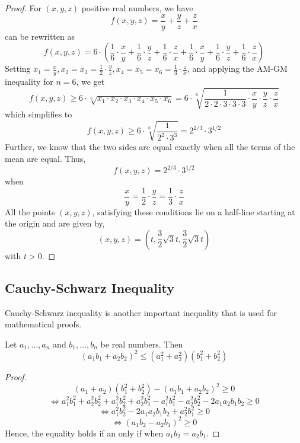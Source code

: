     \begin{proof}
    For \( (x, y, z) \) positive real numbers, we have
    \[
    f(x, y, z) = \frac{x}{y} + \frac{y}{z} + \frac{z}{x}
    \]
    can be rewritten as
    \[
    f(x, y, z) = 6 \cdot \left( \frac{1}{6} \cdot \frac{x}{y} + \frac{1}{6} \cdot \frac{y}{z} + \frac{1}{6} \cdot \frac{z}{x} + \frac{1}{6} \cdot \frac{x}{y} + \frac{1}{6} \cdot \frac{y}{z} + \frac{1}{6} \cdot \frac{z}{x} \right)
    \]
    Setting \( x_1 = \frac{x}{y}, x_2 = x_3 = \frac{1}{2} \cdot \frac{y}{z}, x_4 = x_5 = x_6 = \frac{1}{3} \cdot \frac{z}{x} \), and applying the AM-GM inequality for \( n = 6 \), we get
    \[
    f(x, y, z) \geq 6 \cdot \sqrt[6]{x_1 \cdot x_2 \cdot x_3 \cdot x_4 \cdot x_5 \cdot x_6} = 6 \cdot \sqrt[6]{\frac{1}{2 \cdot 2 \cdot 3 \cdot 3 \cdot 3} \cdot \frac{x}{y} \cdot \frac{y}{z} \cdot \frac{z}{x}}
    \]
    which simplifies to
    \[
    f(x, y, z) \geq 6 \cdot \sqrt[6]{\frac{1}{2^2 \cdot 3^3}} = 2^{2/3} \cdot 3^{1/2}
    \]
    Further, we know that the two sides are equal exactly when all the terms of the mean are equal. Thus,
    \[
    f(x, y, z) = 2^{2/3} \cdot 3^{1/2}
    \]
    when
    \[
    \frac{x}{y} = \frac{1}{2} \cdot \frac{y}{z} = \frac{1}{3} \cdot \frac{z}{x}
    \]
    All the points \( (x, y, z) \), satisfying these conditions lie on a half-line starting at the origin and are given by,
    \[
    (x, y, z) = \left( t, \frac{3}{2}\sqrt{3}t, \frac{3}{2}\sqrt{3}t \right)
    \]
    with \( t > 0 \).
    \end{proof}
    
\subsection{Cauchy-Schwarz Inequality}
Cauchy-Schwarz inequality is another important inequality that is used for mathematical proofs. 

\begin{theorem}\label{CSineq}
    Let \( a_1, \ldots, a_n \) and \( b_1, \ldots, b_n \) be real numbers. Then
\[
(a_1b_1 + a_2b_2)^2 \leq (a_1^2 + a_2^2)(b_1^2 + b_2^2)
\]
\end{theorem}
\begin{proof}
\[
(a_1 + a_2)(b_1^2 + b_2^2) - (a_1b_1 + a_2b_2)^2 \geq 0
\]
\[
\Leftrightarrow a_1^2b_1^2 + a_2^2b_2^2 + a_1^2b_2^2 + a_2^2b_1^2 - a_1^2b_1^2 - a_2^2b_2^2 - 2a_1a_2b_1b_2 \geq 0
\]
\[
\Leftrightarrow a_1^2b_2^2 - 2a_1a_2b_1b_2 + a_2^2b_1^2 \geq 0
\]
\[
\Leftrightarrow (a_1b_2 - a_2b_1)^2 \geq 0
\]
Hence, the equality holds if an only if when $a_1b_2=a_2b_1$.
\end{proof}

